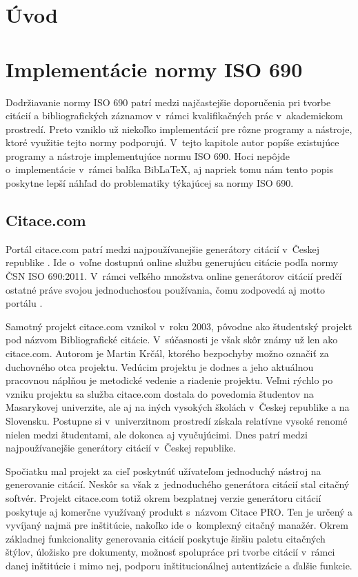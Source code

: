 \documentclass{fithesis3}
\begin{document}
\chapter{Úvod}

\chapter{Implementácie normy ISO 690}
Dodržiavanie normy ISO 690 patrí medzi najčastejšie doporučenia pri tvorbe citácií a bibliografických záznamov v~rámci kvalifikačných prác v~akademickom prostredí. Preto vzniklo už niekoľko implementácií pre rôzne programy a nástroje, ktoré využitie tejto normy podporujú. V~tejto kapitole autor popíše existujúce programy a nástroje implementujúce normu ISO 690. Hoci nepôjde o~implementácie v~rámci balíka Bib\LaTeX, aj napriek tomu nám tento popis poskytne lepší náhľad do problematiky týkajúcej sa normy ISO 690.

	\section{Citace.com}
	Portál citace.com patrí medzi najpoužívanejšie generátory citácií v~Českej republike \cite{Krcal2014}. Ide o~voľne dostupnú online službu generujúcu citácie podľa normy ČSN ISO 690:2011. V~rámci veľkého množstva online generátorov citácií predčí ostatné práve svojou jednoduchosťou používania, čomu zodpovedá aj motto portálu .

	Samotný projekt citace.com vznikol v~roku 2003, pôvodne ako študentský projekt pod názvom Bibliografické citácie. V~súčasnosti je však skôr známy už len ako citace.com. Autorom je Martin Krčál, ktorého bezpochyby možno označiť za duchovného otca projektu. Vedúcim projektu je dodnes a jeho aktuálnou pracovnou náplňou je metodické vedenie a riadenie projektu. Veľmi rýchlo po vzniku projektu sa služba citace.com dostala do povedomia študentov na Masarykovej univerzite, ale aj na iných vysokých školách v~Českej republike a na Slovensku. Postupne si v~univerzitnom prostredí získala relatívne vysoké renomé nielen medzi študentami, ale dokonca aj vyučujúcimi. Dnes patrí medzi najpoužívanejšie generátory citácií v~Českej republike.

	Spočiatku mal projekt za cieľ poskytnúť užívateľom jednoduchý nástroj na generovanie citácií. Neskôr sa však z~jednoduchého generátora citácií stal citačný softvér. Projekt citace.com totiž okrem bezplatnej verzie generátoru citácií poskytuje aj komerčne využívaný produkt s~názvom Citace PRO. Ten je určený a vyvíjaný najmä pre inštitúcie, nakoľko ide o~komplexný citačný manažér. Okrem základnej funkcionality generovania citácií poskytuje širšiu paletu citačných štýlov, úložisko pre dokumenty, možnosť spolupráce pri tvorbe citácií v~rámci danej inštitúcie i mimo nej, podporu inštitucionálnej autentizácie a ďalšie funkcie.
\end{document}
